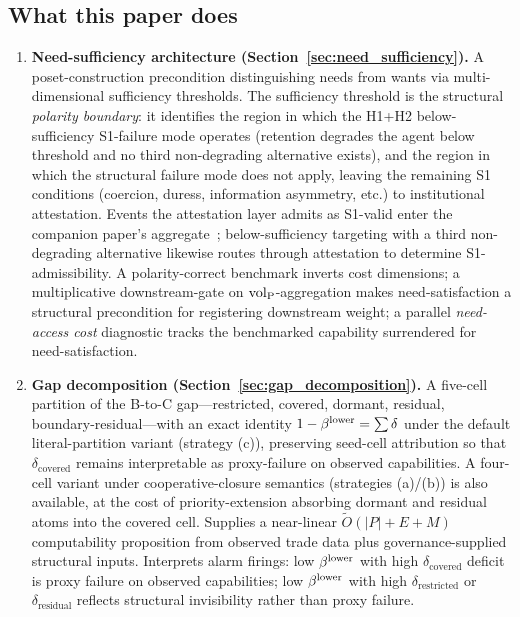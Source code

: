 \subsection{What this paper does}

\begin{enumerate}
\item \textbf{Need-sufficiency architecture
  (Section~\ref{sec:need_sufficiency}).}
  A poset-construction precondition distinguishing needs from
  wants via multi-dimensional sufficiency thresholds.  The
  sufficiency threshold is the structural
  \emph{polarity boundary}: it identifies the region in
  which the H1+H2 below-sufficiency S1-failure mode operates
  (retention degrades the agent below threshold and no third
  non-degrading alternative exists), and the region in which
  the structural failure mode does not apply, leaving the
  remaining S1 conditions (coercion, duress, information
  asymmetry, etc.) to institutional attestation.  Events the
  attestation layer admits as S1-valid enter the companion
  paper's
  aggregate~\citep[Revealed~Sacrifice]{lasser2026paper8a};
  below-sufficiency targeting with a third non-degrading
  alternative likewise routes through attestation to determine
  S1-admissibility.  A
  polarity-correct benchmark inverts cost dimensions; a
  multiplicative downstream-gate on ${\operatorname{vol}_{\mathrm{P}}}$-aggregation makes
  need-satisfaction a structural precondition for registering
  downstream weight; a parallel
  \emph{need-access cost} diagnostic tracks the benchmarked
  capability surrendered for need-satisfaction.

\item \textbf{Gap decomposition
  (Section~\ref{sec:gap_decomposition}).}
  A five-cell partition of the B-to-C gap---restricted,
  covered, dormant, residual, boundary-residual---with an exact
  identity $1 - \beta^{\mathrm{lower}} = \sum \delta$ under the default
  literal-partition variant (strategy (c)), preserving
  seed-cell attribution so that $\delta_{\mathrm{covered}}$
  remains interpretable as proxy-failure on observed
  capabilities.  A four-cell variant under cooperative-closure
  semantics (strategies (a)/(b)) is also available, at the cost
  of priority-extension absorbing dormant and residual atoms
  into the covered cell.  Supplies a
  near-linear $\widetilde{O}(|P|+E+M)$ computability
  proposition from observed trade data plus
  governance-supplied structural inputs.  Interprets alarm firings: low $\beta^{\mathrm{lower}}$ with high
  $\delta_{\mathrm{covered}}$ deficit is proxy failure on
  observed capabilities; low $\beta^{\mathrm{lower}}$ with high
  $\delta_{\mathrm{restricted}}$ or $\delta_{\mathrm{residual}}$
  reflects structural invisibility rather than proxy failure.


\end{enumerate}
